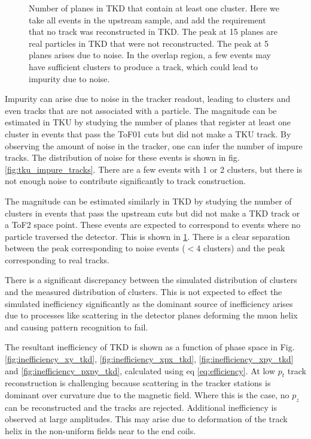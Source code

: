 \begin{figure}[!tbh]
    \centering
    {Number of planes in TKD that contain at least one cluster. Here we 
    take all events in the upstream sample, and add the requirement that no 
    track was reconstructed in TKD. The peak at 15 planes are real particles in 
    TKD that were not reconstructed. The peak at 5 planes arises due to noise. 
    In the overlap region, a few events may have sufficient clusters to produce 
    a track, which could lead to impurity due to noise. \label{fig:tkd_impure_tracks}}
\end{figure}

Impurity can arise due to noise in the tracker readout, leading to clusters and 
even tracks that are not associated with a particle. The magnitude can be 
estimated in TKU by studying the number of planes that register at least one 
cluster in events that pass the ToF01 cuts but did not make a TKU track. By 
observing the amount of noise in the tracker, one can infer the number of impure 
tracks. The distribution of noise for these events is shown in fig.
\ref{fig:tku_impure_tracks}. There are a few events with 1 or 2 clusters, but 
there is not enough noise to contribute significantly to track construction. 

The magnitude can be estimated similarly in TKD by studying
the number of clusters in events that pass the upstream cuts but did not make 
a TKD track or a ToF2 space point. These events are expected to correspond to
events where no particle traversed the detector. This is shown in 
\ref{fig:tkd_impure_tracks}. There is a clear separation between the peak 
corresponding to noise events ($<4$ clusters) and the peak corresponding to real 
tracks. 

There is a significant discrepancy between the simulated distribution of 
clusters and the measured distribution of clusters. This is not expected to
effect the simulated inefficiency significantly as the dominant source of 
inefficiency arises due to processes like scattering in the detector planes
deforming the muon helix and causing pattern recognition to fail.

The resultant inefficiency of TKD is shown as a function
of phase space in Fig. \ref{fig:inefficiency_xy_tkd}, \ref{fig:inefficiency_xpx_tkd},
\ref{fig:inefficiency_xpy_tkd} and \ref{fig:inefficiency_pxpy_tkd}, calculated 
using eq \ref{eq:efficiency}. At low $p_t$ track
reconstruction is challenging because scattering in the tracker stations is
dominant over curvature due to the magnetic field. Where this is the case, no
$p_z$ can be reconstructed and the tracks are rejected. Additional inefficiency
is observed at large amplitudes. This may arise due to deformation of the track
helix in the non-uniform fields near to the end coils.

